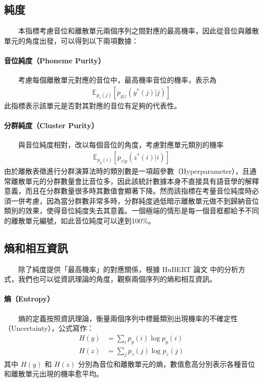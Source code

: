 {\subsection{純度}

　　本指標考慮音位和離散單元兩個序列之間對應的最高機率，因此從音位與離散單元的角度出發，可以得到以下兩項數據：

\paragraph{音位純度（Phoneme Purity）}\hfill \break
%
　　考慮每個離散單元對應的音位中，最高機率音位的機率，表示為
\begin{align}
    \mathbb{E}_{p_z(j)}\left[p_{y|z}(y^*(j)|j) \right]
\end{align}
此指標表示該單元是否對其對應的音位有足夠的代表性。

\paragraph{分群純度（Cluster Purity）}\hfill \break
%
　　與音位純度相對，改以每個音位的角度，考慮對應單元類別的機率
\begin{align}
    \mathbb{E}_{p_y(i)}\left[p_{z|y}(z^*(i)|i) \right]
\end{align}
        由於離散表徵進行分群演算法時的類別數是一項超參數（Hyperparameter），且通常離散單元的分群數量會比音位多，因此該統計數據本身不直接具有語音學的解釋意義，而且在分群數量很多時其數值會顯著下降。然而該指標在考量音位純度時必須一併考慮，因為當分群數非常多時，分群純度過低暗示離散單元做不到歸納音位類別的效果，使得音位純度失去其意義。一個極端的情形是每一個音框都給予不同的離散單元編號，如此音位純度可以達到100\%。

\subsection{熵和相互資訊}

　　除了純度提供「最高機率」的對應關係，根據 HuBERT 論文 \cite{hsu_hubert_2021-2} 中的分析方式，我們也可以從資訊理論的角度，觀察兩個序列的熵和相互資訊。

\paragraph{熵（Entropy）} \hfill \break
%
　　熵的定義按照資訊理論，衡量兩個序列中標籤類別出現機率的不確定性（Uncertainty），公式寫作：
\begin{align}
    H(y) & = \sum_i{p_y(i)\log p_y(i)} \\
    H(z) & = \sum_j{p_z(j)\log p_z(j)}
\end{align}
其中 $H(y)$ 和 $H(z)$ 分別為音位和離散單元的熵，數值愈高分別表示各種音位和離散單元出現的機率愈平均。

}
